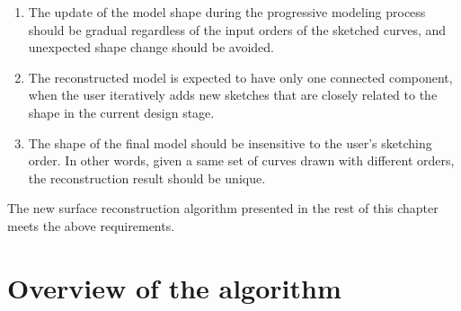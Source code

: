 \begin{enumerate}
    \item The update of the model shape during the progressive modeling process should be gradual regardless of the input orders of the sketched curves, and unexpected shape change should be avoided.
    \label{req:1}
    \item The reconstructed model is expected to have only one connected component, when the user iteratively adds new sketches that are closely related to the shape in the current design stage.
    \label{req:2}
    \item The shape of the final model should be insensitive to the user's sketching order. In other words, given a same set of curves drawn with different orders, the reconstruction result should be unique.
    \label{req:3}
\end{enumerate}

The new surface reconstruction algorithm presented in the rest of
this chapter meets the above requirements.

\section{Overview of the algorithm}
%
\label{ch4:sec:algo:ov}

